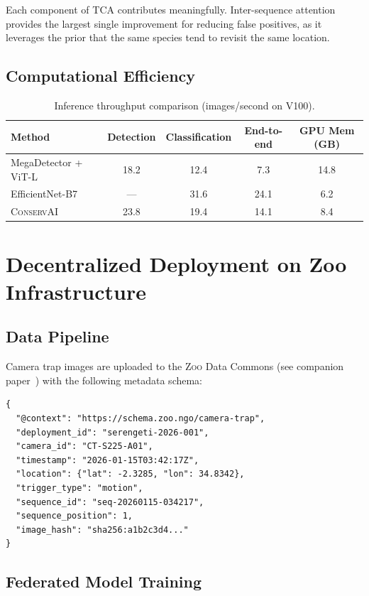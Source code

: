 \documentclass[11pt,letterpaper]{article}
\newcommand{\Zoo}{\textsc{Zoo}}
\newcommand{\ConservAI}{\textsc{ConservAI}}
\begin{document}
Each component of TCA contributes meaningfully. Inter-sequence attention provides the largest single improvement for reducing false positives, as it leverages the prior that the same species tend to revisit the same location.

\subsection{Computational Efficiency}

\begin{table}[htbp]
\centering
\caption{Inference throughput comparison (images/second on V100).}
\label{tab:efficiency}
\begin{tabular}{lcccc}
\toprule
\textbf{Method} & \textbf{Detection} & \textbf{Classification} & \textbf{End-to-end} & \textbf{GPU Mem (GB)} \\
\midrule
MegaDetector + ViT-L & 18.2 & 12.4 & 7.3 & 14.8 \\
EfficientNet-B7 & --- & 31.6 & 24.1 & 6.2 \\
\ConservAI{} & 23.8 & 19.4 & 14.1 & 8.4 \\
\bottomrule
\end{tabular}
\end{table}

\section{Decentralized Deployment on Zoo Infrastructure}

\subsection{Data Pipeline}

Camera trap images are uploaded to the \Zoo{} Data Commons (see companion paper~\cite{zoo2026commons}) with the following metadata schema:

\begin{lstlisting}[basicstyle=\footnotesize\ttfamily, frame=single, caption={Camera trap metadata schema (JSON-LD).}]
{
  "@context": "https://schema.zoo.ngo/camera-trap",
  "deployment_id": "serengeti-2026-001",
  "camera_id": "CT-S225-A01",
  "timestamp": "2026-01-15T03:42:17Z",
  "location": {"lat": -2.3285, "lon": 34.8342},
  "trigger_type": "motion",
  "sequence_id": "seq-20260115-034217",
  "sequence_position": 1,
  "image_hash": "sha256:a1b2c3d4..."
}
\end{lstlisting}

\subsection{Federated Model Training}
\end{document}
